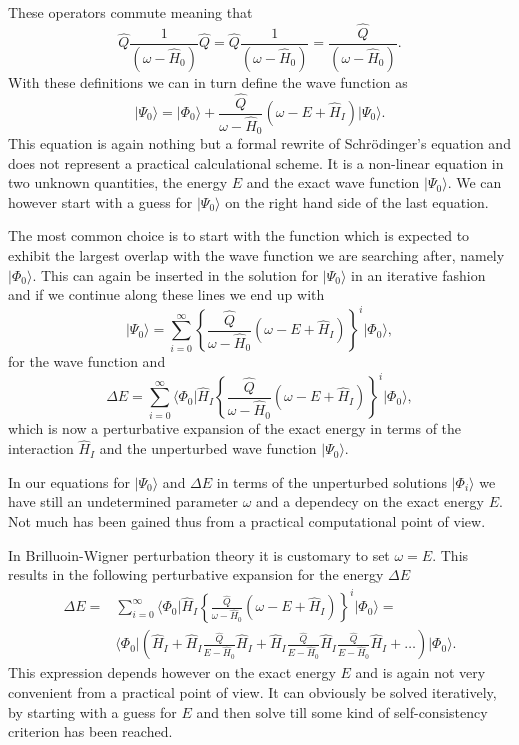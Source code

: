 These operators commute meaning that
\[
\hat{Q}\frac{1}{\left(\omega-\hat{H}_0\right)}\hat{Q}=\hat{Q}\frac{1}{\left(\omega-\hat{H}_0\right)}=\frac{\hat{Q}}{\left(\omega-\hat{H}_0\right)}.
\]
With these definitions we can in turn define the wave function as 
\[
\vert \Psi_0\rangle=\vert \Phi_0\rangle+\frac{\hat{Q}}{\omega-\hat{H}_0}\left(\omega-E+\hat{H}_I\right)\vert \Psi_0\rangle.
\]
This equation is again nothing but a formal rewrite of Schr\"odinger's equation
and does not represent a practical calculational scheme.  
It is a non-linear equation in two unknown quantities, the energy $E$ and the exact
wave function $\vert \Psi_0\rangle$. We can however start with a guess for $\vert \Psi_0\rangle$ on the right hand side of the last equation.



 The most common choice is to start with the function which is expected to exhibit the largest overlap with the wave function we are searching after, namely $\vert \Phi_0\rangle$. This can again be inserted in the solution for $\vert \Psi_0\rangle$ in an iterative fashion and if we continue along these lines we end up with
\[
\vert \Psi_0\rangle=\sum_{i=0}^{\infty}\left\{\frac{\hat{Q}}{\omega-\hat{H}_0}\left(\omega-E+\hat{H}_I\right)\right\}^i\vert \Phi_0\rangle, 
\]
for the wave function and
\[
\Delta E=\sum_{i=0}^{\infty}\langle \Phi_0\vert \hat{H}_I\left\{\frac{\hat{Q}}{\omega-\hat{H}_0}\left(\omega-E+\hat{H}_I\right)\right\}^i\vert \Phi_0\rangle, 
\]
which is now  a perturbative expansion of the exact energy in terms of the interaction
$\hat{H}_I$ and the unperturbed wave function $\vert \Psi_0\rangle$.



In our equations for $\vert \Psi_0\rangle$ and $\Delta E$ in terms of the unperturbed
solutions $\vert \Phi_i\rangle$  we have still an undetermined parameter $\omega$
and a dependecy on the exact energy $E$. Not much has been gained thus from a practical computational point of view. 

In Brilluoin-Wigner perturbation theory it is customary to set $\omega=E$. This results in the following perturbative expansion for the energy $\Delta E$
\begin{align}
\Delta E=&\sum_{i=0}^{\infty}\langle \Phi_0\vert \hat{H}_I\left\{\frac{\hat{Q}}{\omega-\hat{H}_0}\left(\omega-E+\hat{H}_I\right)\right\}^i\vert \Phi_0\rangle=\\
&\langle \Phi_0\vert \left(\hat{H}_I+\hat{H}_I\frac{\hat{Q}}{E-\hat{H}_0}\hat{H}_I+
\hat{H}_I\frac{\hat{Q}}{E-\hat{H}_0}\hat{H}_I\frac{\hat{Q}}{E-\hat{H}_0}\hat{H}_I+\dots\right)\vert \Phi_0\rangle. 
\end{align}
This expression depends however on the exact energy $E$ and is again not very convenient from a practical point of view. It can obviously be solved iteratively, by starting with a guess for  $E$ and then solve till some kind of self-consistency criterion has been reached. 

